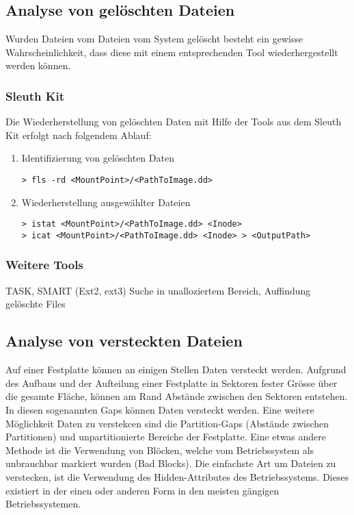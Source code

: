 \subsection{Analyse von gelöschten Dateien}
Wurden Dateien vom Dateien vom System gelöscht besteht ein gewisse Wahrscheinlichkeit, dass diese mit einem entsprechenden Tool wiederhergestellt werden können.

\subsubsection{Sleuth Kit}
Die Wiederherstellung von gelöschten Daten mit Hilfe der Tools aus dem Sleuth Kit erfolgt nach folgendem Ablauf:
 
\begin{enumerate}
\item Identifizierung von gelöschten Daten
\begin{lstlisting}
> fls -rd <MountPoint>/<PathToImage.dd>
\end{lstlisting}
\item Wiederherstellung ausgewählter Dateien
\begin{lstlisting}
> istat <MountPoint>/<PathToImage.dd> <Inode>
> icat <MountPoint>/<PathToImage.dd> <Inode> > <OutputPath>
\end{lstlisting}
\end{enumerate}

\subsubsection{Weitere Tools}
TASK, 
SMART (Ext2, ext3) Suche in unalloziertem Bereich, Auffindung gelöschte Files



\subsection{Analyse von versteckten Dateien}
Auf einer Festplatte können an einigen Stellen Daten versteckt werden. Aufgrund des Aufbaus und der Aufteilung einer Festplatte in Sektoren fester Grösse über die gesamte Fläche, können am Rand Abstände zwischen den Sektoren entstehen. In diesen sogenannten Gaps können Daten versteckt werden. Eine weitere Möglichkeit Daten zu verstekcen sind die Partition-Gaps (Abstände zwischen Partitionen) und unpartitionierte Bereiche der Festplatte. Eine etwas andere Methode ist die Verwendung von Blöcken, welche vom Betriebssystem als unbrauchbar markiert wurden (Bad Blocks).  Die einfachste Art um Dateien zu verstecken, ist die Verwendung des Hidden-Attributes des Betriebssystems. Dieses existiert in der einen oder anderen Form in den meisten gängigen Betriebssystemen.

